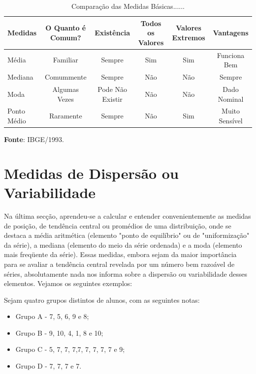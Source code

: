 \begin{table}
\centering
    {
\caption{Comparação das Medidas Básicas......}
\label{tabelarotacionada2}
    \vspace{0.2cm}
\begin{tabular}{l|c|c|c|c|c}
\hline
   Medidas  & O Quanto é Comum? & Existência        & Todos os Valores & Valores Extremos & Vantagens      \\
\hline\hline
   Média    & Familiar          & Sempre            & Sim              & Sim              & Funciona Bem    \\
   Mediana  & Comummente        & Sempre            & Não              & Não              & Sempre          \\
   Moda     & Algumas Vezes     & Pode Não Existir  & Não              & Não              & Dado Nominal    \\ 
Ponto Médio & Raramente         & Sempre            & Não              & Sim              & Muito Sensível  \\  
   \hline\hline 
\end{tabular}} 
\vspace{-1.5cm}
\textbf{Fonte}: IBGE/1993. 
\end{table}



\newpage
\section{Medidas de Dispersão ou Variabilidade}


Na última secção, aprendeu-se a calcular e entender convenientemente as medidas de posição, de tendência central ou promédios de uma distribuição, onde se destaca a média aritmética (elemento "ponto de equilíbrio" ou de "uniformização" da série), a mediana (elemento do meio da série ordenada) e a moda (elemento mais freqüente da série). Essas medidas, embora sejam da maior importância para se avaliar a tendência central revelada por um número bem razoável de séries, absolutamente nada nos informa sobre a dispersão ou variabilidade desses elementos.  Vejamos os seguintes exemplos:\vskip0.3cm

Sejam quatro grupos distintos de alunos, com as seguintes notas:
\vskip0.3cm

  \begin{itemize}
    \item Grupo A - 7, 5, 6, 9 e 8;
    \item Grupo B - 9, 10, 4, 1, 8 e 10;
    \item Grupo C - 5, 7, 7, 7,7, 7, 7, 7, 7 e 9;
    \item Grupo D - 7, 7, 7 e 7.
  \end{itemize}

